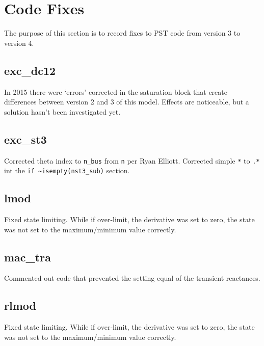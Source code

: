\chapter{Code Fixes}
The purpose of this section is to record fixes to PST code from version 3 to version 4.

\section{exc\_dc12}  
In 2015 there were `errors' corrected in the saturation block that create differences between version 2 and 3 of this model.
Effects are noticeable, but a solution hasn't been investigated yet.

\section{exc\_st3}  
Corrected theta index to \verb|n_bus| from \verb|n| per Ryan Elliott.
Corrected simple \verb|*| to \verb|.*| int the \verb|if ~isempty(nst3_sub)| section.

\section{lmod}  
Fixed state limiting.
 While if over-limit, the derivative was set to zero, the state was not set to the maximum/minimum value correctly.
 
\section{mac\_tra}  
Commented out code that prevented the setting equal of the transient reactances.

\section{rlmod}  
Fixed state limiting.
 While if over-limit, the derivative was set to zero, the state was not set to the maximum/minimum value correctly.
